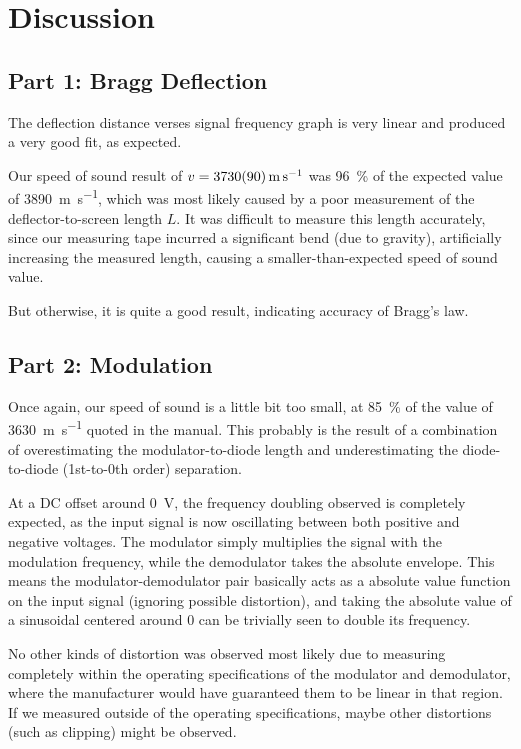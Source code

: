 \documentclass[a4paper]{scrartcl}
\begin{document}
\section{Discussion}
\subsection{Part 1: Bragg Deflection}
The deflection distance verses signal frequency graph is very linear and produced a very good fit, as expected.

Our speed of sound result of \(v = \SI{3730 \pm 90}{\metre\per\second}\) was \SI{96}{\percent} of the expected value of \SI{3890}{\metre\per\second}, which was most likely caused by a poor measurement of the deflector-to-screen length \(L\). It was difficult to measure this length accurately, since our measuring tape incurred a significant bend (due to gravity), artificially increasing the measured length, causing a smaller-than-expected speed of sound value.

But otherwise, it is quite a good result, indicating accuracy of Bragg's law.

\subsection{Part 2: Modulation}
Once again, our speed of sound is a little bit too small, at \SI{85}{\percent} of the value of \SI{3630}{\metre\per\second} quoted in the manual. This probably is the result of a combination of overestimating the modulator-to-diode length and underestimating the diode-to-diode (1st-to-0th order) separation.

At a DC offset around \SI{0}{\volt}, the frequency doubling observed is completely expected, as the input signal is now oscillating between both positive and negative voltages. The modulator simply multiplies the signal with the modulation frequency, while the demodulator takes the absolute envelope. This means the modulator-demodulator pair basically acts as a absolute value function on the input signal (ignoring possible distortion), and taking the absolute value of a sinusoidal centered around 0 can be trivially seen to double its frequency.

No other kinds of distortion was observed most likely due to measuring completely within the operating specifications of the modulator and demodulator, where the manufacturer would have guaranteed them to be linear in that region. If we measured outside of the operating specifications, maybe other distortions (such as clipping) might be observed.
\end{document}
